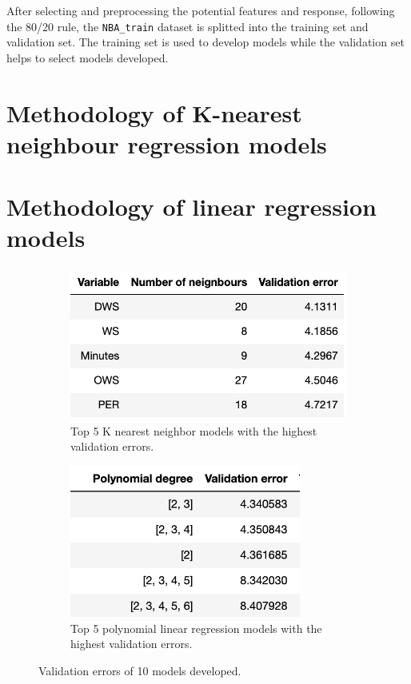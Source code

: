 \documentclass[letterpaper,12pt,twoside,]{pinp}
\begin{document}
After selecting and preprocessing the potential features and response,
following the 80/20 rule, the \texttt{NBA\_train} dataset is splitted
into the training set and validation set. The training set is used to
develop models while the validation set helps to select models
developed.

\hypertarget{methodology-of-k-nearest-neighbour-regression-models}{%
\section{Methodology of K-nearest neighbour regression
models}\label{methodology-of-k-nearest-neighbour-regression-models}}

\hypertarget{methodology-of-linear-regression-models}{%
\section{Methodology of linear regression
models}\label{methodology-of-linear-regression-models}}

\begin{figure}[H]
\begin{subfigure}{0.5\textwidth}
\includegraphics[width=0.9\linewidth, height=5cm]{knn_models.png} 
\caption{Top 5 K nearest neighbor models with the highest validation errors.}
\label{fig:subim1}
\end{subfigure}
\begin{subfigure}{0.5\textwidth}
\includegraphics[width=0.9\linewidth, height=5cm]{poly_models.png}
\caption{Top 5 polynomial linear regression models with the highest validation errors.}
\label{fig:subim2}
\end{subfigure}
\caption{Validation errors of 10 models developed.}
\end{figure}
\end{document}
